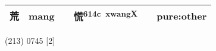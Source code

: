 \documentclass[14pt,a4paper]{scrartcl}
\begin{document}
\begin{longtable}[c]{@{}llllll@{}}
\begin{minipage}[t]{0.14\columnwidth}\raggedright\strut
荒
\strut\end{minipage} &
\begin{minipage}[t]{0.14\columnwidth}\raggedright\strut
mang
\strut\end{minipage} &
\begin{minipage}[t]{0.14\columnwidth}\raggedright\strut
\strut\end{minipage} &
\begin{minipage}[t]{0.14\columnwidth}\raggedright\strut
慌\textsuperscript{614c~xwangX}
\strut\end{minipage} &
\begin{minipage}[t]{0.14\columnwidth}\raggedright\strut
\strut\end{minipage} &
\begin{minipage}[t]{0.14\columnwidth}\raggedright\strut
pure:other
\strut\end{minipage}\tabularnewline
\bottomrule
\end{longtable}

(213) 0745 {[}2{]}
\end{document}

